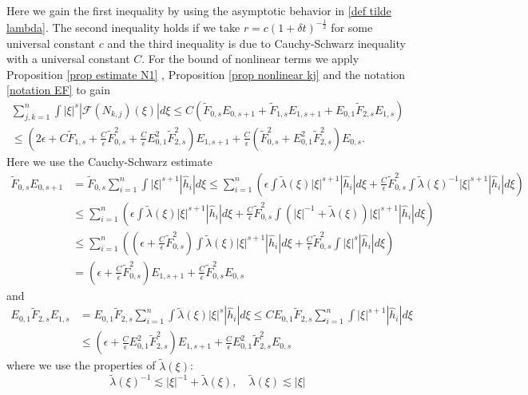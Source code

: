 \documentclass[11pt]{article}
\newcommand{\tla}{\tilde{\lambda}}
\newcommand{\TF}{\tilde{F}}
\theoremstyle{definition}
\numberwithin{equation}{section}
\begin{document}
Here we gain the first inequality by using the asymptotic behavior in \eqref{def tilde lambda}. The second inequality holds if we take $r=c(1+\delta t)^{-\frac{1}{2}}$ for some universal constant $c$ and the third inequality is due to Cauchy-Schwarz inequality with a universal constant $C$. For the bound of nonlinear terms we apply Proposition \ref{prop estimate N1} , Proposition \ref{prop nonlinear kj} and the notation \eqref{notation EF} to gain
\begin{equation}\label{ineq nonlinear cauchy}
    \begin{aligned}
    \sum_{j,k=1}^n\int|\xi|^s|\mathscr{F}(N_{k,j})(\xi)|d\xi\leq C\left( \TF_{0,s}E_{0,s+1}+\TF_{1,s}E_{1,s+1}+E_{0,1}\TF_{2,s}E_{1,s}\right)\\
    \leq \left(2\epsilon+C\TF_{1,s}+\frac{C}{\epsilon}\TF_{0,s}^2+\frac{C}{\epsilon}E_{0,1}^2\TF_{2,s}^2\right) E_{1,s+1}+\frac{C}{\epsilon}\left(\TF_{0,s}^2+E_{0,1}^2\TF_{2,s}^2\right)E_{0,s}.
\end{aligned}
\end{equation}
Here we use the Cauchy-Schwarz estimate
\begin{align}
    \TF_{0,s}E_{0,s+1}&=\TF_{0,s}\sum_{i=1}^n\int|\xi|^{s+1}|\hat{h}_i|d\xi\leq\sum_{i=1}^n\left(\epsilon\int\tla(\xi)|\xi|^{s+1}|\hat{h}_i|d\xi+\frac{C}{\epsilon}\TF_{0,s}^2\int\tla(\xi)^{-1}|\xi|^{s+1}|\hat{h}_i|d\xi\right)\\
    &\leq\sum_{i=1}^n\left(\epsilon\int\tla(\xi)|\xi|^{s+1}|\hat{h}_i|d\xi+\frac{C}{\epsilon}\TF_{0,s}^2\int\left(|\xi|^{-1}+\tla(\xi)\right)|\xi|^{s+1}|\hat{h}_i|d\xi\right)\\
    &\leq\sum_{i=1}^n\left(\left(\epsilon+\frac{C}{\epsilon}\TF_{0,s}^2\right)\int\tla(\xi)|\xi|^{s+1}|\hat{h}_i|d\xi+\frac{C}{\epsilon}\TF_{0,s}^2\int|\xi|^{s}|\hat{h}_i|d\xi\right)\\
    &=\left(\epsilon+\frac{C}{\epsilon}\TF_{0,s}^2\right) E_{1,s+1}+\frac{C}{\epsilon}\TF_{0,s}^2E_{0,s}
\end{align}
and
\begin{align}
    E_{0,1}\TF_{2,s}E_{1,s}&=E_{0,1}\TF_{2,s}\sum_{i=1}^n\int\tla(\xi)|\xi|^s|\hat{h}_i|d\xi\leq CE_{0,1}\TF_{2,s}\sum_{i=1}^n\int|\xi|^{s+1}|\hat{h}_i|d\xi\\
    &\leq\left(\epsilon+\frac{C}{\epsilon}E_{0,1}^2\TF_{2,s}^2\right) E_{1,s+1}+\frac{C}{\epsilon}E_{0,1}^2\TF_{2,s}^2E_{0,s}
\end{align}
where we use the properties of $\tla(\xi)$:
\begin{equation}
    \tla(\xi)^{-1}\lesssim|\xi|^{-1}+\tla(\xi),\quad \tla(\xi)\lesssim|\xi|
\end{equation}
\end{document}
